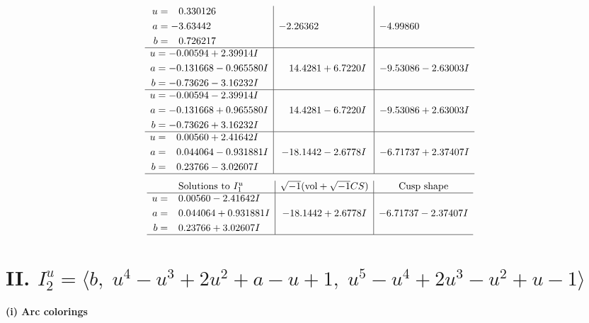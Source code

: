 \documentclass[1p]{elsarticle_modified}
\theoremstyle{definition}
\newcommand{\I}{\sqrt{-1}}
\begin{document}
$$\begin{array}{c|c|c}
\begin{aligned}
u &= \phantom{-}0.330126\phantom{ +0.000000I} \\
a &= -3.63442\phantom{ +0.000000I} \\
b &= \phantom{-}0.726217\phantom{ +0.000000I}\end{aligned}
 & -2.26362\phantom{ +0.000000I} & -4.99860\phantom{ +0.000000I} \\ \hline\begin{aligned}
u &= -0.00594 + 2.39914 I \\
a &= -0.131668 - 0.965580 I \\
b &= -0.73626 - 3.16232 I\end{aligned}
 & \phantom{-}14.4281 + 6.7220 I & -9.53086 - 2.63003 I \\ \hline\begin{aligned}
u &= -0.00594 - 2.39914 I \\
a &= -0.131668 + 0.965580 I \\
b &= -0.73626 + 3.16232 I\end{aligned}
 & \phantom{-}14.4281 - 6.7220 I & -9.53086 + 2.63003 I \\ \hline\begin{aligned}
u &= \phantom{-}0.00560 + 2.41642 I \\
a &= \phantom{-}0.044064 - 0.931881 I \\
b &= \phantom{-}0.23766 - 3.02607 I\end{aligned}
 & -18.1442 - 2.6778 I & -6.71737 + 2.37407 I\\
 \hline 
 \end{array}$$\newpage$$\begin{array}{c|c|c}  
\text{Solutions to }I^u_{1}& \I (\text{vol} + \sqrt{-1}CS) & \text{Cusp shape}\\
 \hline 
\begin{aligned}
u &= \phantom{-}0.00560 - 2.41642 I \\
a &= \phantom{-}0.044064 + 0.931881 I \\
b &= \phantom{-}0.23766 + 3.02607 I\end{aligned}
 & -18.1442 + 2.6778 I & -6.71737 - 2.37407 I\\
 \hline 
 \end{array}$$\newpage\newpage\renewcommand{\arraystretch}{1}
\centering \section*{II. $I^u_{2}= \langle b,\;u^4- u^3+2 u^2+a- u+1,\;u^5- u^4+2 u^3- u^2+u-1 \rangle$}
\flushleft \textbf{(i) Arc colorings}\\
\end{document}
